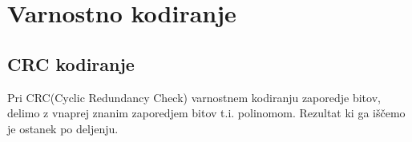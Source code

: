 \documentclass[10pt,a4paper,oneside]{book}
\begin{document}

\chapter{Varnostno kodiranje}
%

\section{CRC kodiranje}
Pri CRC(Cyclic Redundancy Check) varnostnem kodiranju zaporedje bitov, delimo z vnaprej znanim zaporedjem bitov t.i. polinomom. Rezultat ki ga iščemo je ostanek po deljenju.
\end{document}
